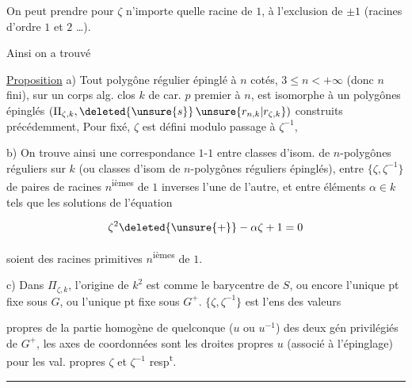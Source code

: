 
On peut prendre pour $\zeta$ n'importe quelle racine de $1$, à l'exclusion de $\pm1$ (racines d'ordre $1$ et $2$ \dots).

Ainsi on a trouvé

\uline{Proposition} a) Tout  polygône régulier épinglé à $n$ cotés, $3\leq n<+\infty$ (donc $n$ fini), sur un corps alg. clos $k$ de car. $p$ premier à $n$, est isomorphe à un  polygônes épinglés $(\Pi_{\zeta,k},\deleted{\unsure{s}}\,\unsure{r_{n,k}|r_{\zeta,k}})$  construits précédemment,  Pour  fixé, $\zeta$ est défini modulo passage à $\zeta^{-1}$, 

b) On trouve ainsi une correspondance $1$-$1$ entre classes d'isom. de $n$-polygônes réguliers sur $k$ (ou classes d'isom de $n$-polygônes réguliers épinglés), entre   $\{\zeta,\zeta^{-1}\}$ de paires de racines  $n$\textsuperscript{ièmes} de $1$ inverses l'une de l'autre, et entre éléments $\alpha\in k$ tels que les  solutions de l'équation


\[\zeta^2\deleted{\unsure{+}}-\alpha\zeta+1=0\]

soient des racines primitives $n$\textsuperscript{ièmes} de $1$.

c) Dans $\Pi_{\zeta,k}$, l'origine de $k^2$ est  comme le barycentre de $S$, ou encore l'unique pt fixe sous $G$, ou l'unique pt fixe sous $G^+$. $\{\zeta,\zeta^{-1}\}$ est l'ens des valeurs


propres de la partie homogène de   quelconque ($u$ ou $u^{-1}$) des deux gén privilégiés de $G^+$, les axes de coordonnées sont les droites propres   $u$ (associé à l'épinglage) pour les val. propres $\zeta$ et $\zeta^{-1}$ resp\textsuperscript{t}.

\begin{center}\rule{1.5cm}{0.4pt}\end{center}

